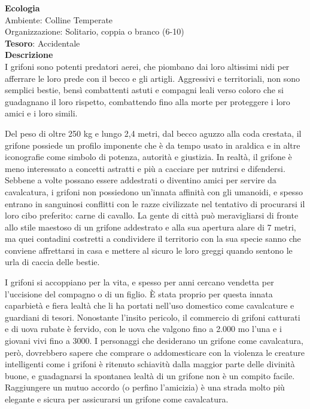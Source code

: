 \begin{multicols}{2}
\textbf{Ecologia}\\
Ambiente: Colline Temperate\\
Organizzazione: Solitario, coppia o branco (6-10)\\
\textbf{Tesoro}: Accidentale\\
\textbf{Descrizione}\\
I grifoni sono potenti predatori aerei, che piombano dai loro altissimi nidi per afferrare le loro prede con il becco e gli artigli. Aggressivi e territoriali, non sono semplici bestie, bensì combattenti astuti e compagni leali verso coloro che si guadagnano il loro rispetto, combattendo fino alla morte per proteggere i loro amici e i loro simili.

Del peso di oltre 250 kg e lungo 2,4 metri, dal becco aguzzo alla coda crestata, il grifone possiede un profilo imponente che è da tempo usato in araldica e in altre iconografie come simbolo di potenza, autorità e giustizia. In realtà, il grifone è meno interessato a concetti astratti e più a cacciare per nutrirsi e difendersi. Sebbene a volte possano essere addestrati o diventino amici per servire da cavalcatura, i grifoni non possiedono un'innata affinità con gli umanoidi, e spesso entrano in sanguinosi conflitti con le razze civilizzate nel tentativo di procurarsi il loro cibo preferito: carne di cavallo. La gente di città può meravigliarsi di fronte allo stile maestoso di un grifone addestrato e alla sua apertura alare di 7 metri, ma quei contadini costretti a condividere il territorio con la sua specie sanno che conviene affrettarsi in casa e mettere al sicuro le loro greggi quando sentono le urla di caccia delle bestie.

I grifoni si accoppiano per la vita, e spesso per anni cercano vendetta per l'uccisione del compagno o di un figlio. È stata proprio per questa innata caparbietà e fiera lealtà che li ha portati nell'uso domestico come cavalcature e guardiani di tesori. Nonostante l'insito pericolo, il commercio di grifoni catturati e di uova rubate è fervido, con le uova che valgono fino a 2.000 mo l'una e i giovani vivi fino a 3000. I personaggi che desiderano un grifone come cavalcatura, però, dovrebbero sapere che comprare o addomesticare con la violenza le creature intelligenti come i grifoni è ritenuto schiavitù dalla maggior parte delle divinità buone, e guadagnarsi la spontanea lealtà di un grifone non è un compito facile. Raggiungere un mutuo accordo (o perfino l'amicizia) è una strada molto più elegante e sicura per assicurarsi un grifone come cavalcatura.


\end{multicols}
